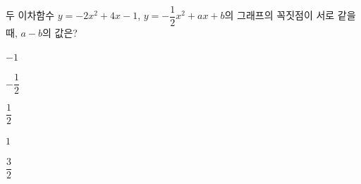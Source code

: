 두 이차함수 $y=-2x^2+4x-1$, $y=-\dfrac{1}{2}x^2+ax+b$의 그래프의 꼭짓점이 서로 같을 때, $a-b$의 값은? 
\begin{choices32}{\rule[-3ex]{0pt}{8ex}$-1$}{\rule[-3ex]{0pt}{8ex}$-\dfrac{1}{2}$}{\rule[-3ex]{0pt}{8ex}$\dfrac{1}{2}$}{\rule[-3ex]{0pt}{8ex}$1$}{\rule[-3ex]{0pt}{8ex}$\dfrac{3}{2}$}\end{choices32}
